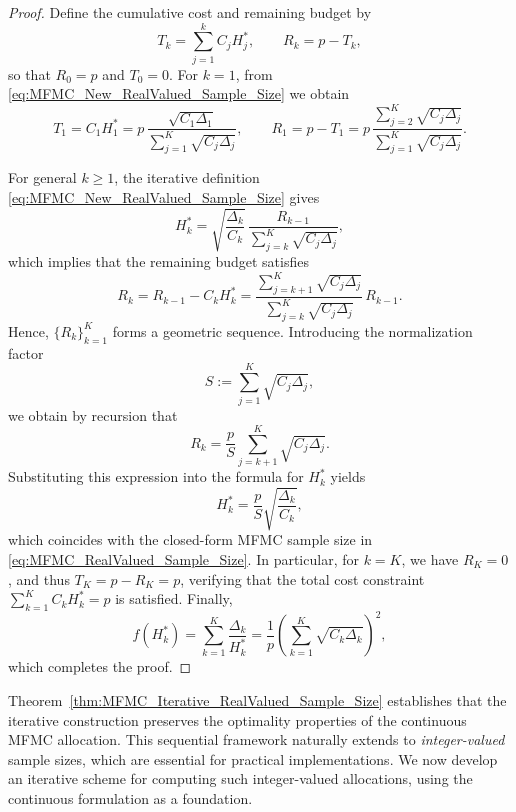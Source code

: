 \begin{proof}
Define the cumulative cost and remaining budget by
\[
    T_k = \sum_{j=1}^k C_j H_j^*, 
    \qquad 
    R_k = p - T_k,
\]
so that $R_0 = p$ and $T_0 = 0$. For $k=1$, from \eqref{eq:MFMC_New_RealValued_Sample_Size} we obtain
\[
    T_1 = C_1H_1^* 
    = p\,\frac{\sqrt{C_1\Delta_1}}{\sum_{j=1}^K \sqrt{C_j\Delta_j}},
    \qquad
    R_1 = p - T_1
    = p\,\frac{\sum_{j=2}^K \sqrt{C_j\Delta_j}}{\sum_{j=1}^K \sqrt{C_j\Delta_j}}.
\]

For general $k\ge 1$, the iterative definition \eqref{eq:MFMC_New_RealValued_Sample_Size} gives
\[
    H_k^*
    = \sqrt{\frac{\Delta_k}{C_k}}\,
      \frac{R_{k-1}}{\sum_{j=k}^K \sqrt{C_j \Delta_j}},
\]
which implies that the remaining budget satisfies
\[
    R_k 
    = R_{k-1} - C_k H_k^*
    = \frac{\sum_{j=k+1}^K \sqrt{C_j \Delta_j}}
           {\sum_{j=k}^K \sqrt{C_j \Delta_j}} \, R_{k-1}.
\]
Hence, $\{R_k\}_{k=1}^K$ forms a geometric sequence. Introducing the normalization factor
\begin{equation}\label{eq:aggregate_cost_variance_weight_S}
    S := \sum_{j=1}^K \sqrt{C_j \Delta_j},
\end{equation}
we obtain by recursion that
\[
    R_k = \frac{p}{S}\sum_{j=k+1}^K\sqrt{C_j\Delta_j}.
\]
Substituting this expression into the formula for $H_k^*$ yields
\[
    H_k^*
    = \frac{p}{S}\sqrt{\frac{\Delta_k}{C_k}},
\]
which coincides with the closed-form MFMC sample size in \eqref{eq:MFMC_RealValued_Sample_Size}.  
In particular, for $k=K$, we have $R_K=0$, and thus $T_K = p - R_K = p$, verifying that the total cost constraint $\sum_{k=1}^K C_k H_k^* = p$ is satisfied.  
Finally,
\[
    f(H_k^*)
    = \sum_{k=1}^K \frac{\Delta_k}{H_k^*}
    = \frac{1}{p} \left(\sum_{k=1}^K \sqrt{C_k\Delta_k}\right)^2,
\]
which completes the proof.
\end{proof}

Theorem~\ref{thm:MFMC_Iterative_RealValued_Sample_Size} establishes that the iterative construction preserves the optimality properties of the continuous MFMC allocation. This sequential framework naturally extends to {\it integer-valued} sample sizes, which are essential for practical implementations. We now develop an iterative scheme for computing such integer-valued allocations, using the continuous formulation as a foundation.

